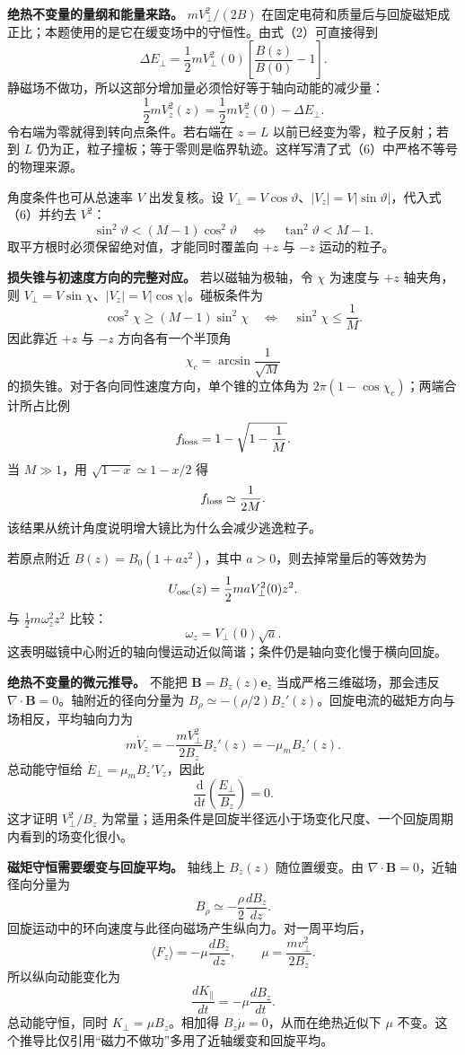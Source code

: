 \documentclass[12pt,a4paper,UTF8]{ctexart}
\begin{document}
\textbf{绝热不变量的量纲和能量来路。} \(mV_\perp^2/(2B)\)
在固定电荷和质量后与回旋磁矩成正比；本题使用的是它在缓变场中的守恒性。由式（2）可直接得到
\[
\Delta E_\perp
=\frac12mV_\perp^2(0)
\left[\frac{B(z)}{B(0)}-1\right].
\] 静磁场不做功，所以这部分增加量必须恰好等于轴向动能的减少量： \[
\frac12mV_z^2(z)
=\frac12mV_z^2(0)-\Delta E_\perp.
\] 令右端为零就得到转向点条件。若右端在 \(z=L\)
以前已经变为零，粒子反射；若到 \(L\)
仍为正，粒子撞板；等于零则是临界轨迹。这样写清了式（6）中严格不等号的物理来源。

角度条件也可从总速率 \(V\) 出发复核。设
\(V_\perp=V\cos\vartheta\)、\(|V_z|=V|\sin\vartheta|\)，代入式（6）并约去
\(V^2\)： \[
\sin^2\vartheta<(M-1)\cos^2\vartheta
\quad\Longleftrightarrow\quad
\tan^2\vartheta<M-1.
\] 取平方根时必须保留绝对值，才能同时覆盖向 \(+z\) 与 \(-z\)
运动的粒子。

\textbf{损失锥与初速度方向的完整对应。} 若以磁轴为极轴，令 \(\chi\)
为速度与 \(+z\) 轴夹角，则
\(V_\perp=V\sin\chi\)、\(|V_z|=V|\cos\chi|\)。碰板条件为 \[
\cos^2\chi\ge(M-1)\sin^2\chi
\quad\Longleftrightarrow\quad
\sin^2\chi\le\frac1M.
\] 因此靠近 \(+z\) 与 \(-z\) 方向各有一个半顶角 \[
\chi_c=\arcsin\frac1{\sqrt M}
\] 的损失锥。对于各向同性速度方向，单个锥的立体角为
\(2\pi(1-\cos\chi_c)\)；两端合计所占比例 \[
f_{\rm loss}
=1-\sqrt{1-\frac1M}.
\] 当 \(M\gg1\)，用 \(\sqrt{1-x}\simeq1-x/2\) 得 \[
f_{\rm loss}\simeq\frac1{2M}.
\] 该结果从统计角度说明增大镜比为什么会减少逃逸粒子。

若原点附近 \(B(z)=B_0(1+az^2)\)，其中 \(a>0\)，则去掉常量后的等效势为 \[
U_{\rm osc}(z)=\frac12maV_\perp^2(0)z^2.
\] 与 \(\frac12m\omega_z^2z^2\) 比较： \[
\boxed{\omega_z=V_\perp(0)\sqrt a}.
\]
这表明磁镜中心附近的轴向慢运动近似简谐；条件仍是轴向变化慢于横向回旋。

\textbf{绝热不变量的微元推导。} 不能把 \(\bm B=B_z(z)\bm e_z\)
当成严格三维磁场，那会违反 \(\nabla\cdot\bm B=0\)。轴附近的径向分量为
\(B_\rho\simeq-(\rho/2)B_z'(z)\)。回旋电流的磁矩方向与场相反，平均轴向力为
\[
m\dot V_z=-\frac{mV_\perp^2}{2B_z}B_z'(z)=-\mu_mB_z'(z).
\] 总动能守恒给 \(\dot E_\perp=\mu_mB_z'V_z\)，因此 \[
\frac{\mathrm d}{\mathrm dt}\left(\frac{E_\perp}{B_z}\right)=0.
\] 这才证明 \(V_\perp^2/B_z\)
为常量；适用条件是回旋半径远小于场变化尺度、一个回旋周期内看到的场变化很小。

\textbf{磁矩守恒需要缓变与回旋平均。} 轴线上 \(B_z(z)\) 随位置缓变。由
\(\nabla\cdot\bm B=0\)，近轴径向分量为 \[
B_\rho\simeq-\frac\rho2\frac{dB_z}{dz}.
\] 回旋运动中的环向速度与此径向磁场产生纵向力。对一周平均后， \[
\langle F_z\rangle=-\mu\frac{dB_z}{dz},\qquad
\mu=\frac{mv_\perp^2}{2B_z}.
\] 所以纵向动能变化为 \[
\frac{dK_\parallel}{dt}=-\mu\frac{dB_z}{dt}.
\] 总动能守恒，同时 \(K_\perp=\mu B_z\)。相加得
\(B_z\dot\mu=0\)，从而在绝热近似下 \(\mu\)
不变。这个推导比仅引用``磁力不做功''多用了近轴缓变和回旋平均。
\end{document}
